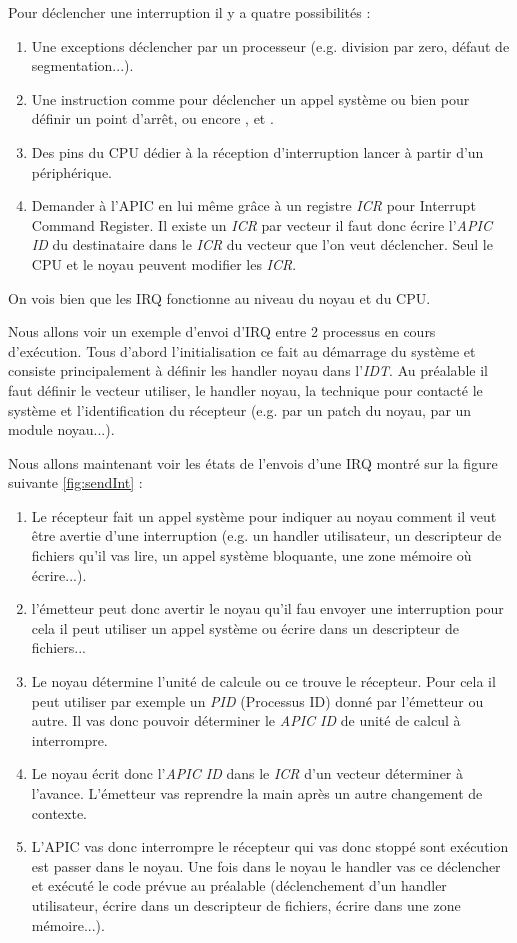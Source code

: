 Pour déclencher une interruption il y a quatre possibilités :

\begin{enumerate}
  \item Une exceptions déclencher par un processeur (e.g. division par zero, défaut de segmentation...).
  \item Une instruction comme  pour déclencher un appel système ou bien  pour définir un point d'arrêt, ou encore ,  et .
  \item Des pins du CPU dédier à la réception d'interruption lancer à partir d'un périphérique.
  \item Demander à l'APIC en lui même grâce à un registre \emph{ICR} pour Interrupt Command Register.
  Il existe un \emph{ICR} par vecteur il faut donc écrire l'\emph{APIC ID} du destinataire dans le \emph{ICR} du vecteur que l'on veut déclencher.
  Seul le CPU et le noyau peuvent modifier les \emph{ICR}.
\end{enumerate}

On vois bien que les IRQ fonctionne au niveau du noyau et du CPU.

Nous allons voir un exemple d'envoi d'IRQ entre 2 processus en cours d'exécution.
Tous d'abord l'initialisation ce fait au démarrage du système et consiste principalement à définir les handler noyau dans l'\emph{IDT}.
Au préalable il faut définir le vecteur utiliser, le handler noyau, la technique pour contacté le système et l'identification du récepteur (e.g. par un patch du noyau, par un module noyau...).

Nous allons maintenant voir les états de l'envois d'une IRQ montré sur la figure suivante \ref{fig:sendInt} :

\begin{enumerate}[label=\protect\circled{\arabic*}]
  \item Le récepteur fait un appel système pour indiquer au noyau comment il veut être avertie d'une interruption (e.g. un handler utilisateur, un descripteur de fichiers qu'il vas lire, un appel système bloquante, une zone mémoire où écrire...).
  \item l'émetteur peut donc avertir le noyau qu'il fau envoyer une interruption pour cela il peut utiliser un appel système ou écrire dans un descripteur de fichiers...
  \item Le noyau détermine l'unité de calcule ou ce trouve le récepteur. Pour cela il peut utiliser par exemple un \emph{PID} (Processus ID) donné par l'émetteur ou autre.
  Il vas donc pouvoir déterminer le \emph{APIC ID} de unité de calcul à interrompre.
  \item Le noyau écrit donc l'\emph{APIC ID} dans le \emph{ICR} d'un vecteur déterminer à l'avance. L'émetteur vas reprendre la main après un autre changement de contexte.
  \item L'APIC vas donc interrompre le récepteur qui vas donc stoppé sont exécution est passer dans le noyau.
  Une fois dans le noyau le handler vas ce déclencher et exécuté le code prévue au préalable (déclenchement d'un handler utilisateur, écrire dans un descripteur de fichiers, écrire dans une zone mémoire...).
\end{enumerate}

